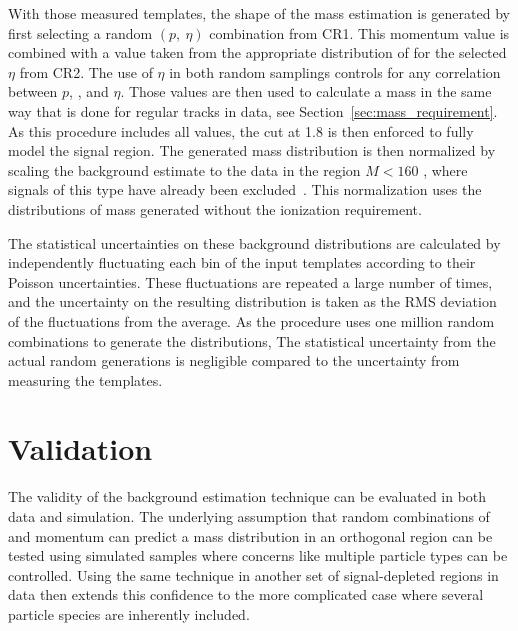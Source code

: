 With those measured templates, the shape of the mass estimation is generated by first selecting a random $(p,\ \eta)$ combination from CR1. 
This momentum value is combined with a \dedx value taken from the appropriate distribution of \dedx for the selected $\eta$ from CR2. 
The use of $\eta$ in both random samplings controls for any correlation between $p$, \dedx, and $\eta$. 
Those values are then used to calculate a mass in the same way that is done for regular tracks in data, see Section~\ref{sec:mass_requirement}.
As this procedure includes all \dedx values, the cut at 1.8 \MeVgcm is then enforced to fully model the signal region.
The generated mass distribution is then normalized by scaling the background estimate to the data in the region $M < 160$ \GeV, where signals of this type have already been excluded~\cite{SUSY-2014-09}.
This normalization uses the distributions of mass generated without the ionization requirement.

The statistical uncertainties on these background distributions are calculated by independently fluctuating each bin of the input templates according to their Poisson uncertainties. 
These fluctuations are repeated a large number of times, and the uncertainty on the resulting distribution is taken as the \ac{RMS} deviation of the fluctuations from the average.
As the procedure uses one million random combinations to generate the distributions, The statistical uncertainty from the actual random generations is negligible compared to the uncertainty from measuring the templates.

\section{Validation}

The validity of the background estimation technique can be evaluated in both data and simulation.
The underlying assumption that random combinations of \dedx and momentum can predict a mass distribution in an orthogonal region can be tested using simulated samples where concerns like multiple particle types can be controlled.
Using the same technique in another set of signal-depleted regions in data then extends this confidence to the more complicated case where several particle species are inherently included.

